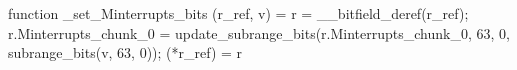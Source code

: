 function _set_Minterrupts_bits (r_ref, v) = {
    r = __bitfield_deref(r_ref);
    r.Minterrupts_chunk_0 = update_subrange_bits(r.Minterrupts_chunk_0, 63, 0, subrange_bits(v, 63, 0));
    (*r_ref) = r
}

